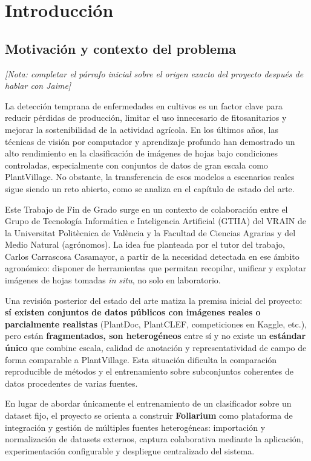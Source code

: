 \documentclass[11pt,spanish,listoffigures,listoftables]{tfgetsinf}
\begin{document}
\mainmatter

\chapter{Introducción}
\section{Motivación y contexto del problema}

\textit{[Nota: completar el párrafo inicial sobre el origen exacto del proyecto después de hablar con Jaime]}

La detección temprana de enfermedades en cultivos es un factor clave para reducir pérdidas de producción, limitar el uso innecesario de fitosanitarios y mejorar la sostenibilidad de la actividad agrícola. En los últimos años, las técnicas de visión por computador y aprendizaje profundo han demostrado un alto rendimiento en la clasificación de imágenes de hojas bajo condiciones controladas, especialmente con conjuntos de datos de gran escala como PlantVillage. No obstante, la transferencia de esos modelos a escenarios reales sigue siendo un reto abierto, como se analiza en el capítulo de estado del arte.

Este Trabajo de Fin de Grado surge en un contexto de colaboración entre el Grupo de Tecnología Informática e Inteligencia Artificial (GTIIA) del VRAIN de la Universitat Politècnica de València y la Facultad de Ciencias Agrarias y del Medio Natural (agrónomos). La idea fue planteada por el tutor del trabajo, Carlos Carrascosa Casamayor, a partir de la necesidad detectada en ese ámbito agronómico: disponer de herramientas que permitan recopilar, unificar y explotar imágenes de hojas tomadas \textit{in situ}, no solo en laboratorio.

Una revisión posterior del estado del arte matiza la premisa inicial del proyecto: \textbf{sí existen conjuntos de datos públicos con imágenes reales o parcialmente realistas} (PlantDoc, PlantCLEF, competiciones en Kaggle, etc.), pero están \textbf{fragmentados, son heterogéneos} entre sí y no existe un \textbf{estándar único} que combine escala, calidad de anotación y representatividad de campo de forma comparable a PlantVillage. Esta situación dificulta la comparación reproducible de métodos y el entrenamiento sobre subconjuntos coherentes de datos procedentes de varias fuentes.

En lugar de abordar únicamente el entrenamiento de un clasificador sobre un dataset fijo, el proyecto se orienta a construir \textbf{Foliarium} como plataforma de integración y gestión de múltiples fuentes heterogéneas: importación y normalización de datasets externos, captura colaborativa mediante la aplicación, experimentación configurable y despliegue centralizado del sistema.
\end{document}
